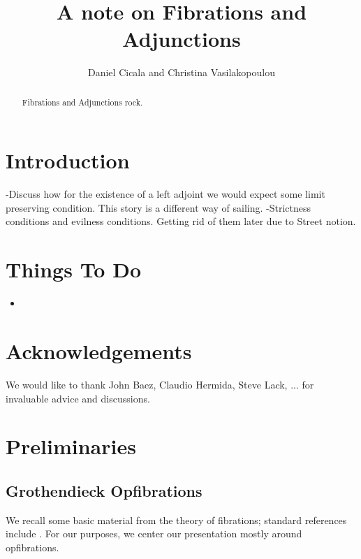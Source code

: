 \documentclass{amsart}
\begin{document}
\title{A note on Fibrations and Adjunctions}

\author{Daniel Cicala and Christina Vasilakopoulou} 
\address{Departement of Mathematics, University of California, Riverside, 900 University Avenue, 92521, USA}

\begin{abstract}
Fibrations and Adjunctions rock.
\end{abstract}

\maketitle

\tableofcontents


\section{Introduction}

-Discuss how for the existence of a left adjoint we would expect some limit preserving condition. This story is a different way of sailing.
-Strictness conditions and evilness conditions. Getting rid of them later due to Street notion.

\section*{Things To Do}
\begin{itemize}
\item 
\end{itemize}

\section*{Acknowledgements} We would like to thank John Baez, Claudio Hermida, Steve Lack, ... for invaluable advice and discussions.

\section{Preliminaries}\label{sec:preliminaries}

\subsection*{Grothendieck Opfibrations}
We recall some basic material from the theory of fibrations; standard references include  \cite{Grayfibredandcofibred,hermidaphd,Handbook2}. 
For our purposes, we center our presentation mostly around opfibrations.
\end{document}

